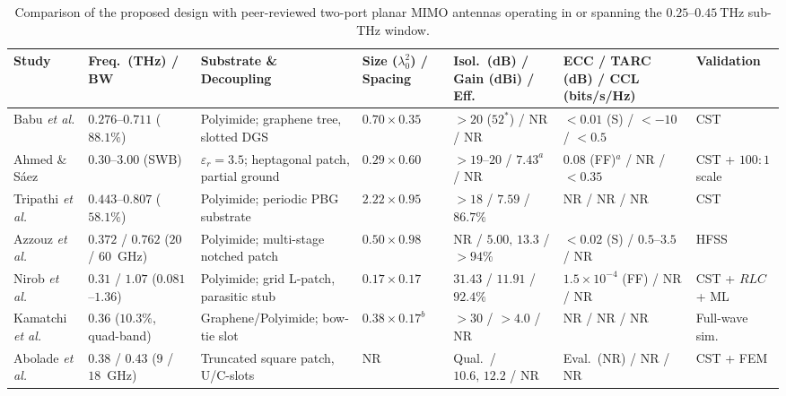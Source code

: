 \documentclass[referee,pdflatex,sn-mathphys-ay]{sn-jnl}
\begin{document}
\begin{table}[!t]
\caption{Comparison of the proposed design with peer-reviewed two-port planar MIMO antennas operating in or spanning the \(0.25\)--\(0.45~\mathrm{THz}\) sub-THz window.}
\label{tab:comparison}
\centering
\renewcommand{\arraystretch}{1.15}
\footnotesize
\setlength{\tabcolsep}{2.5pt}
\begin{tabularx}{\textwidth}{@{}>{\raggedright\arraybackslash}p{1.75cm} >{\centering\arraybackslash}p{1.55cm} >{\raggedright\arraybackslash}p{2.50cm} >{\centering\arraybackslash}p{2.00cm} >{\centering\arraybackslash}p{2.10cm} >{\centering\arraybackslash}p{2.20cm} >{\raggedright\arraybackslash}X@{}}
\toprule
\textbf{Study} & \textbf{Freq.\ (THz) / BW} & \textbf{Substrate \& Decoupling} & \textbf{Size ($\lambda_0^2$) / Spacing} & \textbf{Isol.\ (dB) / Gain (dBi) / Eff.} & \textbf{ECC / TARC (dB) / CCL (bits/s/Hz)} & \textbf{Validation} \\
\midrule
Babu \textit{et al.} \citep{babu2021} & $0.276$--$0.711$ ($88.1\%$) & Polyimide; graphene tree, slotted DGS & $0.70 \times 0.35$ & $>20$ ($52^{*}$) / NR / NR & $<0.01$ (S) / $<-10$ / $<0.5$ & CST \\
Ahmed \& S\'aez \citep{ahmed2023} & $0.30$--$3.00$ (SWB) & $\varepsilon_r=3.5$; heptagonal patch, partial ground & $0.29 \times 0.60$ & $>19$--$20$ / $7.43^{a}$ / NR & $0.08$ (FF)$^{a}$ / NR / $<0.35$ & CST + $100:1$ scale \\
Tripathi \textit{et al.} \citep{tripathi2023} & $0.443$--$0.807$ ($58.1\%$) & Polyimide; periodic PBG substrate & $2.22 \times 0.95$ & $>18$ / $7.59$ / $86.7\%$ & NR / NR / NR & CST \\
Azzouz \textit{et al.} \citep{azzouz2025} & $0.372$ / $0.762$ ($20$ / $60$~GHz) & Polyimide; multi-stage notched patch & $0.50 \times 0.98$ & NR / $5.00,\, 13.3$ / $>94\%$ & $<0.02$ (S) / $0.5$--$3.5$ / NR & HFSS \\
Nirob \textit{et al.} \citep{nirob2025} & $0.31$ / $1.07$ ($0.081$--$1.36$) & Polyimide; grid L-patch, parasitic stub & $0.17 \times 0.17$ & $31.43$ / $11.91$ / $92.4\%$ & $1.5\times10^{-4}$ (FF) / NR / NR & CST + $RLC$ + ML \\
Kamatchi \textit{et al.} \citep{kavitha2025} & $0.36$ ($10.3\%$, quad-band) & Graphene/\allowbreak Polyimide; bow-tie slot & $0.38 \times 0.17^{b}$ & $>30$ / $>4.0$ / NR & NR / NR / NR & Full-wave sim. \\
Abolade \textit{et al.} \citep{abolade2026} & $0.38$ / $0.43$ ($9$ / $18$~GHz) & Truncated square patch, U/C-slots & NR & Qual.\ / $10.6,\, 12.2$ / NR & Eval.\ (NR) / NR / NR & CST + FEM \\

\end{tabularx}
\end{table}
\end{document}
